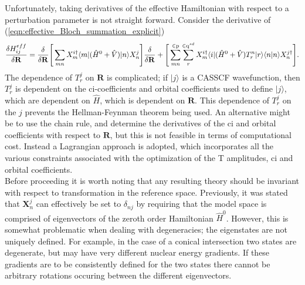 \documentclass[12pt]{article}
\begin{document}
\noindent Unfortunately, taking derivatives
of the effective Hamiltonian with respect to a perturbation parameter is not
straight forward. Consider the derivative of (\ref{eqn:effective_Bloch_summation_explicit})
\begin{equation}
\frac{\delta H^{eff}_{ij}} {\delta \mathbf{R} } =
\frac{\delta } {\delta \mathbf{R} } \Bigg{[} \sum_{mn}
 X_{m}^{i\dagger}\langle m | (\hat{H}^{0} + \hat{V}) | n \rangle X_{n}^{j} \Bigg {]}
\frac{\delta } {\delta \mathbf{R} }
+ \Bigg{[}  
\sum_{mn}^{\in \mathrm{p} }\sum_{r}^{\in \mathrm{q}^{sd}}
 X_{m}^{i\dagger}
\langle i | (\hat{H}^{0}+\hat{V}) T^{n}_{r} |r \rangle\langle n | n \rangle
 X_{n}^{j\dagger}
 \Bigg {]}.
\label{eqn:effective_Bloch_summation_derivative}
\end{equation}
The dependence of $T^{j}_{r}$ on $\mathbf{R}$ is complicated; if $|j\rangle$ is a CASSCF wavefunction, then $T^{j}_{r}$ is
dependent on the ci-coefficients and orbital coefficients used to define $|j\rangle$, which are dependent on $\hat{H}$,
which is dependent on $\mathbf{R}$. This dependence of $T^{j}_{r}$ on the $j$ prevents the Hellman-Feynman theorem being used. 
An alternative might be to use the chain rule, and determine the derivatives of the ci and
orbital coefficients with respect to $\mathbf{R}$, but this is not feasible in terms of computational cost.
Instead a Lagrangian approach is adopted, which incorporates all the various constraints associated with the optimization 
of the T amplitudes, ci and orbital coefficients.\\

\noindent Before proceeding it is worth noting that any resulting theory should be invariant with 
respect to transformation in the reference space. Previously, it was stated that $\mathbf{X}_{n}^{j}$ 
can effectively be set to $\delta_{nj}$ by requiring that the model space is comprised of eigenvectors
of the zeroth order Hamiltonian $\hat{H}^{0}$. However, this is somewhat problematic when dealing with 
degeneracies; the eigenstates are not uniquely defined. For example, in the case of a conical intersection two states are
degenerate, but may have very different nuclear energy gradients. If these gradients are to
be consistently defined for the two states there cannot be arbitrary rotations occuring between the
different eigenvectors.\\
\end{document}
